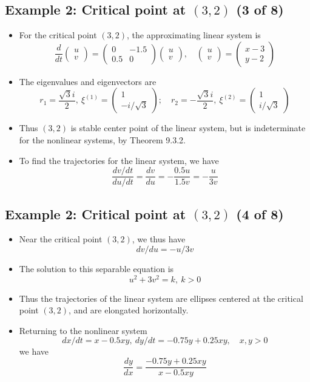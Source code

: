 \documentclass[11pt,a4paper]{article}
\begin{document}
	\subsection*{Example 2: Critical point at $(3,2)$ (3 of 8)}
	\begin{itemize}
		\item For the critical point $(3,2)$, the approximating linear system is
		$$
		\frac{d}{dt}
		\begin{pmatrix}
			u\\
			v
		\end{pmatrix} =
		\begin{pmatrix}
			0 & -1.5\\
			0.5 & 0
		\end{pmatrix}
		\begin{pmatrix}
			u\\
			v
		\end{pmatrix},\quad
		\begin{pmatrix}
			u\\
			v
		\end{pmatrix}=
		\begin{pmatrix}
			x-3\\
			y-2
		\end{pmatrix}
		$$
		\item The eigenvalues and eigenvectors are
		$$
		r_1 = \frac{\sqrt{3}i}{2},\ \xi^{(1)} = 
		\begin{pmatrix}
			1\\
			-i/\sqrt{3}
		\end{pmatrix};\quad r_2 = -\frac{\sqrt{3}i}{2},\ \xi^{(2)} =
		\begin{pmatrix}
			1\\
			i/\sqrt{3}
		\end{pmatrix}
		$$
		\item Thus $(3,2)$ is stable center point of the linear system, but is indeterminate for the nonlinear systems, by Theorem 9.3.2.
		\item To find the trajectories for the linear system, we have
		$$
		\frac{dv/dt}{du/dt} = \frac{dv}{du} = -\frac{0.5u}{1.5v} = -\frac{u}{3v}
		$$
	\end{itemize}
	\subsection*{Example 2: Critical point at $(3,2)$ (4 of 8)}
	\begin{itemize}
		\item Near the critical point $(3,2)$, we thus have
		$$
		dv/du = -u/3v
		$$
		\item The solution to this separable equation is
		$$
		u^2 + 3v^2 = k,\ k>0
		$$
		\item Thus the trajectories of the linear system are ellipses centered at the critical point $(3,2)$, and are elongated horizontally.
		\item Returning to the nonlinear system
		$$
		dx/dt = x-0.5xy,\ dy/dt = -0.75y+0.25xy,\quad x,y>0
		$$
		we have
		$$
		\frac{dy}{dx} = \frac{-0.75y+0.25xy}{x-0.5xy}
		$$
	\end{itemize}
\end{document}
